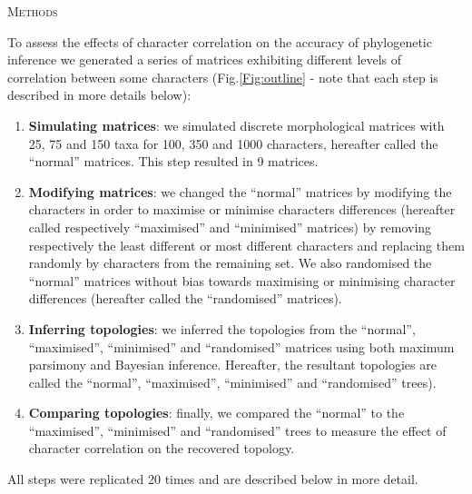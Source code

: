 \documentclass[12pt,letterpaper]{article}
\renewcommand{\section}[1]{%
\bigskip
\begin{center}
\begin{Large}
\normalfont\scshape #1
\medskip
\end{Large}
\end{center}}
\begin{document}
\section{Methods}
To assess the effects of character correlation on the accuracy of phylogenetic inference we generated a series of matrices exhibiting different levels of correlation between some characters (Fig.\ref{Fig:outline} - note that each step is described in more details below):
\begin{enumerate}
    \item \textbf{Simulating matrices}: we simulated discrete morphological matrices with 25, 75 and 150 taxa for 100, 350 and 1000 characters, hereafter called the ``normal'' matrices. This step resulted in 9 matrices.

    \item \textbf{Modifying matrices}: we changed the ``normal'' matrices by modifying the characters in order to maximise or minimise characters differences (hereafter called respectively ``maximised'' and ``minimised'' matrices) by removing respectively the least different or most different characters and replacing them randomly by characters from the remaining set.
    We also randomised the ``normal'' matrices without bias towards maximising or minimising character differences (hereafter called the ``randomised'' matrices).

    \item \textbf{Inferring topologies}: we inferred the topologies from the ``normal'', ``maximised'', ``minimised'' and ``randomised'' matrices using both maximum parsimony and Bayesian inference.
    Hereafter, the resultant topologies are called the ``normal'', ``maximised'', ``minimised'' and ``randomised'' trees).

    \item \textbf{Comparing topologies}: finally, we compared the ``normal'' to the ``maximised'', ``minimised'' and ``randomised'' trees to measure the effect of character correlation on the recovered topology.

\end{enumerate}
All steps were replicated 20 times and are described below in more detail.
\end{document}
